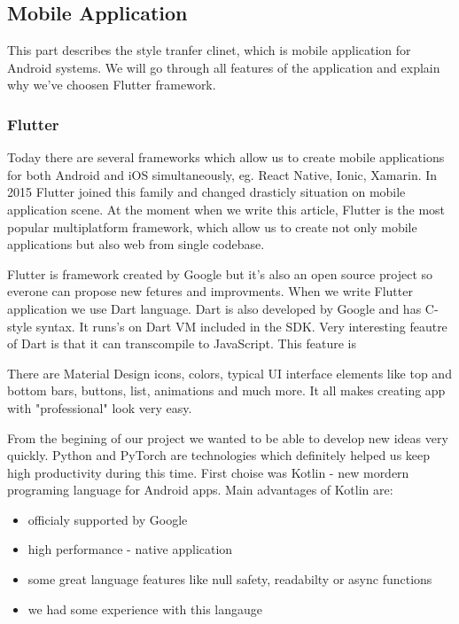 \documentclass[../Main.tex]{subfiles}
\begin{document}
   

\subsection{Mobile Application}
    This part describes the style tranfer clinet, which is mobile application 
    for Android systems. We will go through all features of the application and
    explain why we've choosen Flutter framework. 
    \subsubsection{Flutter}
        Today there are several frameworks which allow us to create mobile 
        applications for both Android and iOS simultaneously, 
        eg. React Native, Ionic, Xamarin.
        In 2015 Flutter joined this family and changed drasticly situation
        on mobile application scene. At the moment when we write this article,
        Flutter is the most popular multiplatform framework, which allow us to 
        create not only mobile applications but also web from single codebase.
    
        Flutter is framework created by Google but it's also an open source project 
        so everone can propose new fetures and improvments. 
        When we write Flutter application we use Dart language.
        Dart is also developed by Google and has C-style syntax.
        It runs's on Dart VM included in the SDK. 
        Very interesting feautre of Dart is that it can transcompile to JavaScript.
        This feature is 
    
    There are Material Design 
        icons, colors, typical UI interface elements like top and bottom bars,
        buttons, list, animations and much more. 
        It all makes creating app with "professional" look very easy.
        
        
        From the begining of our project we wanted to be able to develop new ideas
        very quickly.
        Python and PyTorch are technologies which definitely helped us keep high
        productivity during this time. First choise was Kotlin - new mordern programing 
        language for Android apps. Main advantages of Kotlin are:
            \begin{itemize}
                \item officialy supported by Google
                \item high performance - native application
                \item some great language features like null safety, readabilty or async functions
                \item we had some experience with this langauge
            \end{itemize}
            
\end{document}
